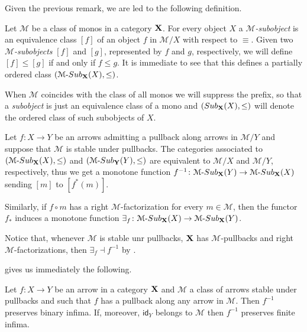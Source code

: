 \documentclass[a4paper,UKenglish,cleveref,pdftex,thm-restate,numberwithinsect]{lipics-v2021}
\newcommand{\id}[1]{\mathsf{id}_{#1}}
\def\X{\textbf {\textup{X}}}
\newcommand{\sub}[3]{{\mathcal{#1}}\textrm{-}\mathsf{Sub}_{\textbf {\textup{#2}}}(#3)}
\newcommand{\msub}[2]{\mathsf{Sub}_{\textbf {\textup{#1}}}(#2)}
\begin{document}
Given the previous remark, we are led to the following definition.

\begin{definition} Let $\mathcal{M}$ be a class of monos in a category $\X$. For every object $X$ a \emph{$\mathcal{M}$-subobject} is an equivalence class $[f]$ of an object $f$ in $\mathcal{M}/X$ with respect to $\equiv$. Given two \emph{$\mathcal{M}$-subobjects} $[f]$ and $[g]$, represented by $f$ and $g$, respectively, we will define $[f]\leq [g]$ if and only if $f\leq g$. It is immediate to see that this defines a partially ordered class $(\sub{M}{X}{X}, \leq)$. 
	
	When $\mathcal{M}$ coincides with the class of all monos we will suppress the prefix, so that a \emph{subobject} is just an equivalence class of a mono and $(\msub{X}{X}, \leq)$ will denote the ordered class of such subobjects of $X$.
\end{definition}

\begin{remark}\label{rem:pbo} Let $f\colon X\to Y$ be an arrows admitting a pullback along arrows in $\mathcal{M}/Y$ and suppose that $\mathcal{M}$ is stable under pullbacks. The categories associated to $(\sub{M}{X}{X}, \leq)$ and $(\sub{M}{Y}{Y}, \leq)$ are equivalent to $\mathcal{M}/X$ and $\mathcal{M}/Y$, respectively, thus we get a monotone function $f^{-1}\colon \sub{M}{X}{Y}\to \sub{M}{X}{X}$ sending $[m]$ to $[f^*(m)]$.
	
	Similarly, if $f\circ m$ has a right $\mathcal{M}$-factorization for every $m\in \mathcal{M}$, then the functor $f_*$ induces a monotone function $\exists_f\colon \sub{M}{X}{X}\to \sub{M}{X}{Y}$.
	
	Notice that, whenever $\mathcal{M}$ is stable unr pullbacks, $\X$ has $\mathcal{M}$-pullbacks and  right $\mathcal{M}$-factorizations, then $\exists_f \dashv f^{-1}$ by .
\end{remark}

 gives us immediately the following.

\begin{proposition}\label{prop:finlim}
	Let $f\colon X\to Y$ be an arrow in a category $\X$ and $\mathcal{M}$ a class of arrows stable under pullbacks and such that $f$ has a pullback along any arrow in $\mathcal{M}$. Then $f^{-1}$ preserves binary infima. If, moreover, $\id{Y}$ belongs to $\mathcal{M}$ then $f^{-1}$ preserves finite infima.
\end{proposition}
\end{document}
